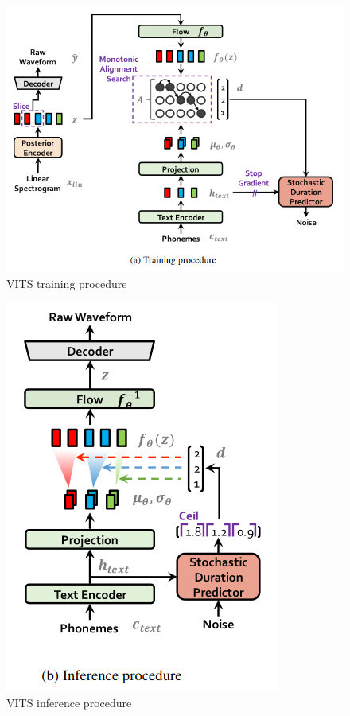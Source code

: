 \documentclass[conference]{IEEEtran}
\begin{document}
\begin{figure}[htb]
    \centering
    \includegraphics[scale=0.4]{imgs/vits/training.png}
    \caption{VITS training procedure}
    \label{fig:vits-training}
\end{figure}
\begin{figure}[htb]
    \centering
    \includegraphics[scale=0.4]{imgs/vits/inference.png}
    \caption{VITS inference procedure}
    \label{fig:vits-inference}
\end{figure}
\end{document}
